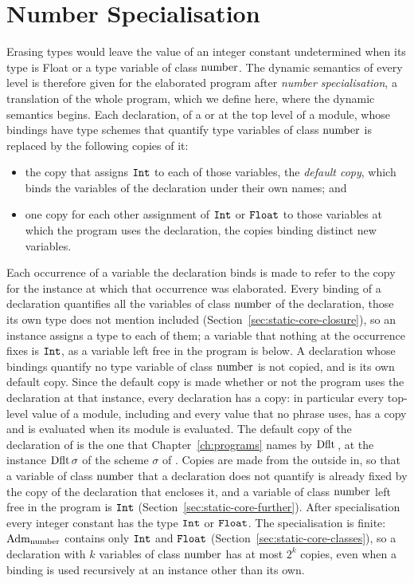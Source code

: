 \section{Number Specialisation}\label{sec:dynamic-core-numbers}

Erasing types would leave the value of an integer constant undetermined when
its type is Float or a type variable of class $\mathrm{number}$. The dynamic semantics
of every level is therefore given for the elaborated program after
\emph{number specialisation}, a translation of the whole program, which we
define here, where the dynamic semantics begins. %
Each declaration, of a  or at the top level of a module, whose
bindings have type schemes that quantify type variables of class $\mathrm{number}$ is
replaced by the following copies of it:
\begin{itemize}
\item the copy that assigns $\mathtt{Int}$ to each of those variables, the
  \emph{default copy}, which binds the variables of the declaration under
  their own names; and
\item one copy for each other assignment of $\mathtt{Int}$ or $\mathtt{Float}$ to those
  variables at which the program uses the declaration, the copies binding
  distinct new variables.
\end{itemize}
Each occurrence of a variable the declaration binds is made to refer to the
copy for the instance at which that occurrence was elaborated. Every binding
of a declaration quantifies all the variables of class $\mathrm{number}$ of the
declaration, those its own type does not mention included
(Section~\ref{sec:static-core-closure}), so an instance assigns a type to each
of them; a variable that nothing at the occurrence fixes is $\mathtt{Int}$, as a
variable left free in the program is below. %
A declaration
whose bindings quantify no type variable of class $\mathrm{number}$ is not copied, and
is its own default copy. Since the
default copy is made whether or not the program uses the declaration at that
instance, every declaration has a copy: in particular every top-level value
of a module, including  and every value that no phrase uses, has a
copy and is evaluated when its module is evaluated. %
The default copy of the declaration of  is the one that
Chapter~\ref{ch:programs} names by $\mathrm{Dflt}\,$, at the instance
$\mathrm{Dflt}\,\sigma$ of the scheme $\sigma$ of . %
Copies are made from the outside in, so that a variable of class $\mathrm{number}$
that a declaration does not quantify is already fixed by the copy of the
declaration that encloses it, and a variable of class $\mathrm{number}$ left free in
the program is $\mathtt{Int}$ (Section~\ref{sec:static-core-further}). %
After specialisation every integer constant has the type $\mathtt{Int}$ or
$\mathtt{Float}$. The specialisation is finite: $\mathrm{Adm}_{\mathrm{number}}$ contains only $\mathtt{Int}$
and $\mathtt{Float}$ (Section~\ref{sec:static-core-classes}), so a declaration with
$k$ variables of class $\mathrm{number}$ has at most $2^k$ copies, even when a binding
is used recursively at an instance other than its own.

